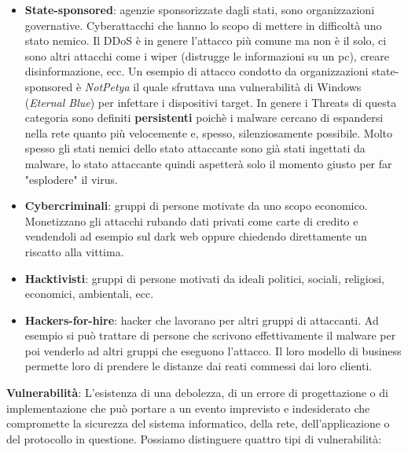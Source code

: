 \begin{itemize}
    \item \textbf{State-sponsored}: agenzie sponsorizzate dagli stati, sono 
    organizzazioni governative. Cyberattacchi che hanno lo scopo di mettere in
    difficoltà uno stato nemico. Il DDoS è in genere l'attacco più comune ma non è il 
    solo, ci sono altri attacchi come i wiper (distrugge le informazioni su un pc), 
    creare disinformazione, ecc. Un esempio di attacco condotto da organizzazioni
    state-sponsored è \textit{NotPetya} il quale sfruttava una vulnerabilità di Windows
    (\textit{Eternal Blue}) per infettare i dispositivi target. In genere i Threats di questa
    categoria sono definiti \textbf{persistenti} poichè i malware cercano di 
    espandersi nella rete quanto più velocemente e, spesso, silenziosamente possibile.
    Molto spesso gli stati nemici dello stato attaccante sono già stati ingettati
    da malware, lo stato attaccante quindi aspetterà solo il momento giusto per far
    "esplodere" il virus.
    \item \textbf{Cybercriminali}: gruppi di persone motivate da uno scopo economico. 
    Monetizzano gli attacchi rubando dati privati come carte di credito e 
    vendendoli ad esempio sul dark web oppure chiedendo direttamente un 
    riscatto alla vittima.
    \item \textbf{Hacktivisti}: gruppi di persone motivati da ideali politici, 
    sociali, religiosi, economici, ambientali, ecc. 
    \item \textbf{Hackers-for-hire}: hacker che lavorano per altri gruppi di 
    attaccanti. Ad esempio si può trattare di persone che scrivono effettivamente 
    il malware per poi venderlo ad altri gruppi che eseguono l'attacco. Il 
    loro modello di business permette loro di prendere le distanze dai reati 
    commessi dai loro clienti.
\end{itemize}

\textbf{Vulnerabilità}: L'esistenza di una debolezza, di un errore di 
progettazione o di implementazione che può portare a un evento imprevisto e 
indesiderato che compromette la sicurezza del sistema informatico, della rete, 
dell'applicazione o del protocollo in questione. Possiamo distinguere quattro 
tipi di vulnerabilità:

